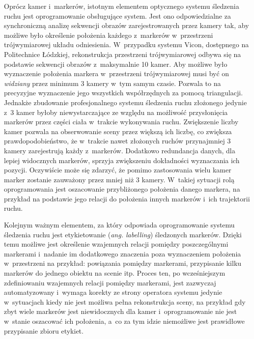 Oprócz kamer i~markerów, istotnym elementem optycznego systemu śledzenia ruchu jest oprogramowanie obsługujące system. Jest ono odpowiedzialne za synchroniczną analizę sekwencji obrazów zarejestrowanych przez kamery tak, aby możliwe było określenie położenia każdego z~markerów w~przestrzeni trójwymiarowej układu odniesienia. W~przypadku systemu Vicon, dostępnego na Politechnice Łódzkiej, rekonstrukcja przestrzeni trójwymiarowej odbywa się na podstawie sekwencji obrazów z~maksymalnie 10 kamer. Aby możliwe było wyznaczenie położenia markera w~przestrzeni trójwymiarowej musi być on \textsl{widziany} przez minimum 3 kamery w~tym samym czasie. Pozwala to na precyzyjne wyznaczenie jego wszystkich współrzędnych za pomocą triangulacji. Jednakże zbudowanie profesjonalnego systemu śledzenia ruchu złożonego jedynie z~3 kamer byłoby niewystarczające ze względu na możliwość przysłonięcia markerów przez części ciała w~trakcie wykonywania ruchu. Zwiększenie liczby kamer pozwala na obserwowanie sceny przez większą ich liczbę, co zwiększa prawdopodobieństwo, że w~trakcie nawet złożonych ruchów przynajmniej 3 kamery zarejestrują każdy z~markerów. Dodatkowo redundancja danych, dla lepiej widocznych markerów, sprzyja zwiększeniu dokładności wyznaczania ich pozycji. Oczywiście może się zdarzyć, że pomimo zastosowania wielu kamer marker zostanie zauważony przez mniej niż 3 kamery. W~takiej sytuacji rolą oprogramowania jest oszacowanie przybliżonego położenia danego markera, na przykład na podstawie jego relacji do położenia innych markerów i~ich trajektorii ruchu.
			
Kolejnym ważnym elementem, za który odpowiada oprogramowanie systemu śledzenia ruchu jest etykietowanie (\emph{ang. labelling}) śledzonych markerów. Dzięki temu możliwe jest określenie wzajemnych relacji pomiędzy poszczególnymi markerami i~nadanie im dodatkowego znaczenia poza wyznaczeniem położenia w~przestrzeni na przykład: powiązania pomiędzy markerami, przypisanie kilku markerów do jednego obiektu na scenie itp. Proces ten, po wcześniejszym zdefiniowaniu wzajemnych relacji pomiędzy markerami, jest zazwyczaj automatyzowany i~wymaga korekty ze strony operatora systemu jedynie w~sytuacjach kiedy nie jest możliwa pełna rekonstrukcja sceny, na przykład gdy zbyt wiele markerów jest niewidocznych dla kamer i~oprogramowanie nie jest w~stanie oszacować ich położenia, a~co za tym idzie niemożliwe jest prawidłowe przypisanie zbioru etykiet.\\ 
			
